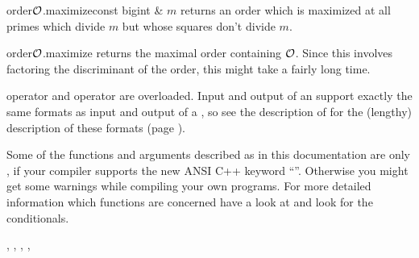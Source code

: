 \begin{cfcode}{order}{$\mathcal{O}$.maximize}{const bigint & $m$}
  returns an order which is maximized at all primes which divide $m$ but whose squares don't
  divide $m$.
\end{cfcode}

\begin{cfcode}{order}{$\mathcal{O}$.maximize}{}
  returns the maximal order containing $\mathcal{O}$.  Since this involves factoring the discriminant of
  the order, this might take a fairly long time.
\end{cfcode}



\IO

 operator \code{>>} and  operator \code{<<} are overloaded.  Input
and output of an  support exactly the same formats as input and output of a
, so see the description of  for the (lengthy) description
of these formats (page \pageref{order_io}).



\WARNINGS

Some of the functions and arguments described as  in this documentation are only
, if your compiler supports the new ANSI C++ keyword ``''.  Otherwise
you might get some warnings while compiling your own programs.  For more detailed information
which functions are concerned have a look at  and look for the
 conditionals.



\SEEALSO

, , ,
, 



\EXAMPLES

